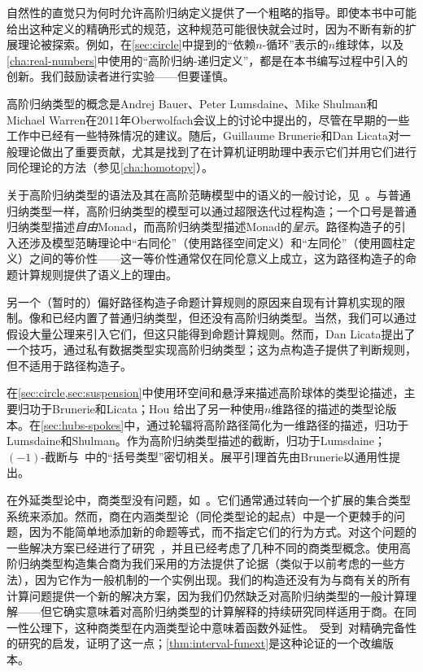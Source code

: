 自然性的直觉只为何时允许高阶归纳定义提供了一个粗略的指导。即使本书中可能给出这种定义的精确形式的规范，这种规范可能很快就会过时，因为不断有新的扩展理论被探索。例如，在\cref{sec:circle}中提到的“依赖$n$-循环”表示的$n$维球体，以及\cref{cha:real-numbers}中使用的“高阶归纳-递归定义”，都是在本书编写过程中引入的创新。我们鼓励读者进行实验——但要谨慎。

\sectionNotes

高阶归纳类型的概念是Andrej Bauer、Peter Lumsdaine、Mike Shulman和Michael Warren在2011年Oberwolfach会议上的讨论中提出的，尽管在早期的一些工作中已经有一些特殊情况的建议。随后，Guillaume Brunerie和Dan Licata对一般理论做出了重要贡献，尤其是找到了在计算机证明助理中表示它们并用它们进行同伦理论的方法（参见\cref{cha:homotopy}）。

关于高阶归纳类型的语法及其在高阶范畴模型中的语义的一般讨论，见~\cite{ls:hits}。与普通归纳类型一样，高阶归纳类型的模型可以通过超限迭代过程构造；一个口号是普通归纳类型描述\emph{自由}Monad，而高阶归纳类型描述Monad的\emph{呈示}。路径构造子的引入还涉及模型范畴理论中“右同伦”（使用路径空间定义）和“左同伦”（使用圆柱定义）之间的等价性——这一等价性通常仅在同伦意义上成立，这为路径构造子的命题计算规则提供了语义上的理由。

另一个（暂时的）偏好路径构造子命题计算规则的原因来自现有计算机实现的限制。像\Coq 和已经内置了普通归纳类型，但还没有高阶归纳类型。当然，我们可以通过假设大量公理来引入它们，但这只能得到命题计算规则。然而，Dan Licata提出了一个技巧，通过私有数据类型实现高阶归纳类型；这为点构造子提供了判断规则，但不适用于路径构造子。

在\cref{sec:circle,sec:suspension}中使用环空间和悬浮来描述高阶球体的类型论描述，主要归功于Brunerie和Licata；Hou 给出了另一种使用$n$维路径的描述的类型论版本。在\cref{sec:hubs-spokes}中，通过轮辐将高阶路径简化为一维路径的描述，归功于Lumsdaine和Shulman。作为高阶归纳类型描述的截断，归功于Lumsdaine；$(-1)$-截断与~\cite{ab:bracket-types}中的“括号类型”密切相关。展平引理首先由Brunerie以通用性提出。

在外延类型论中，商类型没有问题，如\NuPRL~\cite{constable+86nuprl-book}。它们通常通过转向一个扩展的集合类型系统来添加。然而，商在内涵类型论（同伦类型论的起点）中是一个更棘手的问题，因为不能简单地添加新的命题等式，而不指定它们的行为方式。对这个问题的一些解决方案已经进行了研究~\cite{hofmann:thesis,Altenkirch1999,altenkirch+07ott}，并且已经考虑了几种不同的商类型概念。使用高阶归纳类型构造集合商为我们采用的方法提供了论据（类似于以前考虑的一些方法），因为它作为一般机制的一个实例出现。我们的构造还没有为与商有关的所有计算问题提供一个新的解决方案，因为我们仍然缺乏对高阶归纳类型的一般计算理解——但它确实意味着对高阶归纳类型的计算解释的持续研究同样适用于商。在同一性公理下，这种商类型在内涵类型论中意味着函数外延性。~\cite{hofmann:thesis}受到~\cite{carboni}对精确完备性的研究的启发，证明了这一点；\cref{thm:interval-funext}是这种论证的一个改编版本。

